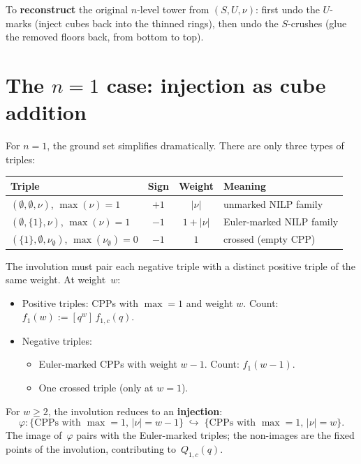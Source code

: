 \documentclass[11pt]{article}
\theoremstyle{plain}
\theoremstyle{definition}
\begin{document}
\noindent
To \textbf{reconstruct} the original $n$-level tower from
$(S, U, \nu)$: first undo the $U$-marks (inject cubes back into
the thinned rings), then undo the $S$-crushes (glue the removed
floors back, from bottom to top).


\section{The $n = 1$ case: injection as cube addition}
\label{sec:n1}

For $n = 1$, the ground set simplifies dramatically.  There are only
three types of triples:

\begin{center}
\renewcommand{\arraystretch}{1.3}
\begin{tabular}{l|c|c|l}
\textbf{Triple} & \textbf{Sign} & \textbf{Weight} &
  \textbf{Meaning}
\\ \hline
$(\emptyset, \emptyset, \nu)$, $\max(\nu) = 1$
  & $+1$ & $|\nu|$
  & unmarked NILP family
\\
$(\emptyset, \{1\}, \nu)$, $\max(\nu) = 1$
  & $-1$ & $1 + |\nu|$
  & Euler-marked NILP family
\\
$(\{1\}, \emptyset, \nu_\emptyset)$, $\max(\nu_\emptyset) = 0$
  & $-1$ & $1$
  & crossed (empty CPP)
\end{tabular}
\end{center}

The involution must pair each negative triple with a distinct positive
triple of the same weight.  At weight~$w$:
\begin{itemize}
  \item Positive triples: CPPs with $\max = 1$ and weight $w$.
    Count: $f_1(w) := [q^w]\,f_{1,c}(q)$.
  \item Negative triples:
    \begin{itemize}
      \item Euler-marked CPPs with weight $w - 1$.
        Count: $f_1(w-1)$.
      \item One crossed triple (only at $w = 1$).
    \end{itemize}
\end{itemize}

For $w \geq 2$, the involution reduces to an \textbf{injection}:
\begin{equation}\label{eq:injection}
  \varphi\colon \{\text{CPPs with } \max = 1,\, |\nu| = w-1\}
  \;\hookrightarrow\;
  \{\text{CPPs with } \max = 1,\, |\nu| = w\}.
\end{equation}
The image of~$\varphi$ pairs with the Euler-marked triples; the
non-images are the fixed points of the involution, contributing
to~$Q_{1,c}(q)$.
\end{document}
